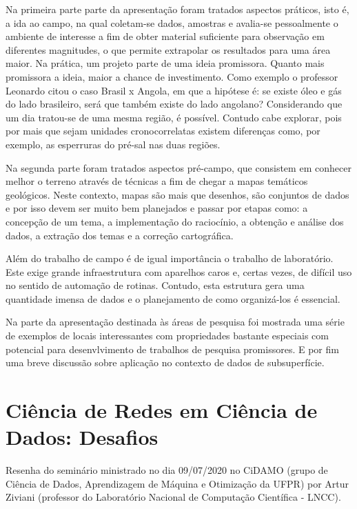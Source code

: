 \documentclass[
	12pt,				%
	openright,			%
	twoside,			%
	a4paper,			%
	english,			%
	brazil,				%
	svgnames
	]{abntex2}\usepackage[]{graphicx}\usepackage[]{color}
\begin{document}
Na primeira parte parte da apresentação foram tratados aspectos práticos, isto é, a ida ao campo, na qual coletam-se dados, amostras e avalia-se pessoalmente o ambiente de interesse a fim de obter material suficiente para observação em diferentes magnitudes, o que permite extrapolar os resultados para uma área maior. Na prática, um projeto parte de uma ideia promissora. Quanto mais promissora a ideia, maior a chance de investimento. Como exemplo o professor Leonardo citou o caso Brasil x Angola, em que a hipótese é: se existe óleo e gás do lado brasileiro, será que também existe do lado angolano? Considerando que um dia tratou-se de uma mesma região, é possível. Contudo cabe explorar, pois por mais que sejam unidades cronocorrelatas existem diferenças como, por exemplo, as esperruras do pré-sal nas duas regiões.

Na segunda parte foram tratados aspectos pré-campo, que consistem em conhecer melhor o terreno através de técnicas a fim de chegar a mapas temáticos geológicos. Neste contexto, mapas são mais que desenhos, são conjuntos de dados e por isso devem ser muito bem planejados e passar por etapas como: a concepção de um tema, a implementação do raciocínio, a obtenção e análise dos dados, a extração dos temas e a correção cartográfica.

Além do trabalho de campo é de igual importância o trabalho de laboratório. Este exige grande infraestrutura com aparelhos caros e, certas vezes, de difícil uso no sentido de automação de rotinas. Contudo, esta estrutura gera uma quantidade imensa de dados e o planejamento de como organizá-los é essencial.

Na parte da apresentação destinada às áreas de pesquisa foi mostrada uma série de exemplos de locais interessantes com propriedades bastante especiais com potencial para desenvlvimento de trabalhos de pesquisa promissores. E por fim uma breve discussão sobre aplicação no contexto de dados de subsuperfície.



\chapter{Ciência de Redes em Ciência de Dados: Desafios}
\label{cap:res12}


Resenha do seminário ministrado no dia 09/07/2020 no CiDAMO (grupo de Ciência de Dados, Aprendizagem de Máquina e Otimização da UFPR) por Artur Ziviani (professor do Laboratório Nacional de Computação Científica - LNCC).
\end{document}
